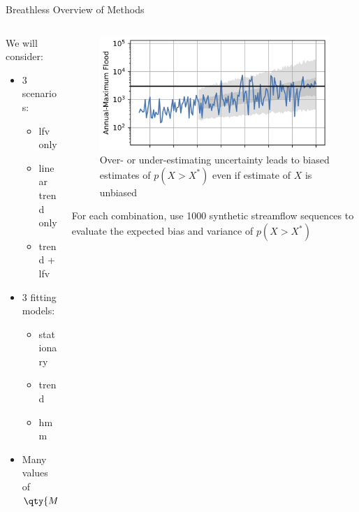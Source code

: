 \documentclass[
  10pt,     %
  handout   %
]{beamer}
\begin{document}
\begin{frame}{Breathless Overview of Methods}
  \begin{columns}[T]
    \begin{column}{0.475\textwidth}
      We will consider:
      \begin{itemize}
        \item 3 scenarios:
        \begin{itemize}
          \item \gls{lfv} only
          \item linear trend only
          \item trend + \gls{lfv}
        \end{itemize}
        \item 3 fitting models:
        \begin{itemize}
          \item stationary
          \item trend
          \item \gls{hmm}
        \end{itemize}
        \item Many values of $\qty{M, N}$
      \end{itemize}
    \end{column}
    \pause
    \begin{column}{0.475\textwidth}
      \begin{figure}
        \caption{Over- or under-estimating uncertainty leads to biased estimates of $p(X > X^*)$ even if estimate of $X$ is unbiased}
        \includegraphics[width=\textwidth]{Example-NINO3-M100-N50-LN2.jpg}
      \end{figure}
      For each combination, use \num{1000} synthetic streamflow sequences to evaluate the expected bias and variance of $p(X > X^*)$
    \end{column}
  \end{columns}
\end{frame}
\end{document}
